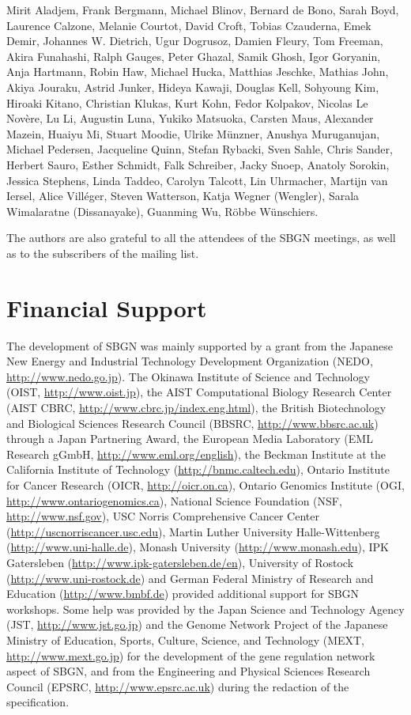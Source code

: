 Mirit Aladjem, Frank Bergmann, Michael Blinov, Bernard de Bono, Sarah Boyd, Laurence Calzone, Melanie Courtot, David Croft, Tobias Czauderna, Emek Demir, Johannes W. Dietrich, Ugur Dogrusoz, Damien Fleury, Tom Freeman, Akira Funahashi, Ralph Gauges, Peter Ghazal, Samik Ghosh, Igor Goryanin, Anja Hartmann, Robin Haw, Michael Hucka, Matthias Jeschke, Mathias John, Akiya Jouraku, Astrid Junker, Hideya Kawaji, Douglas Kell, Sohyoung Kim, Hiroaki Kitano, Christian Klukas, Kurt Kohn, Fedor Kolpakov, Nicolas Le Nov\`{e}re, Lu Li, Augustin Luna, Yukiko Matsuoka, Carsten Maus, Alexander Mazein, Huaiyu Mi, Stuart Moodie, Ulrike M\"unzner, Anushya Muruganujan, Michael Pedersen, Jacqueline Quinn, Stefan Rybacki, Sven Sahle, Chris Sander, Herbert Sauro, Esther Schmidt, Falk Schreiber, Jacky Snoep, Anatoly Sorokin, Jessica Stephens, Linda Taddeo, Carolyn Talcott, Lin Uhrmacher, Martijn van Iersel, Alice Vill\'{e}ger, Steven Watterson, Katja Wegner (Wengler), Sarala Wimalaratne (Dissanayake), Guanming Wu, R\"obbe W\"unschiers.

The authors are also grateful to all the attendees of the SBGN meetings, as 
well as to the subscribers of the  mailing list.


\section{Financial Support}

The development of SBGN was mainly supported by a grant from the Japanese New Energy and Industrial Technology Development Organization (NEDO, \url{http://www.nedo.go.jp}). 
The Okinawa Institute of Science and Technology (OIST, \url{http://www.oist.jp}), 
the AIST Computational Biology Research Center (AIST CBRC, \url{http://www.cbrc.jp/index.eng.html}), 
the British Biotechnology and Biological Sciences Research Council (BBSRC, \url{http://www.bbsrc.ac.uk}) through a Japan Partnering Award, 
the European Media Laboratory (EML Research gGmbH, \url{http://www.eml.org/english}), 
the Beckman Institute at the California Institute of Technology (\url{http://bnmc.caltech.edu}), 
Ontario Institute for Cancer Research (OICR, \url{http://oicr.on.ca}), 
Ontario Genomics Institute (OGI, \url{http://www.ontariogenomics.ca}), 
National Science Foundation (NSF, \url{http://www.nsf.gov}), 
USC Norris Comprehensive Cancer Center (\url{http://uscnorriscancer.usc.edu}), 
Martin Luther University Halle-Wittenberg (\url{http://www.uni-halle.de}), 
Monash University (\url{http://www.monash.edu}), 
IPK Gatersleben (\url{http://www.ipk-gatersleben.de/en}), 
University of Rostock (\url{http://www.uni-rostock.de})  and 
German Federal Ministry of Research and Education (\url{http://www.bmbf.de}) provided additional support for SBGN workshops. 
Some help was provided by the Japan Science and Technology Agency (JST, \url{http://www.jst.go.jp}) and the Genome Network Project of the Japanese Ministry of Education, Sports, Culture, Science, and Technology (MEXT, \url{http://www.mext.go.jp}) for the development of the gene regulation network aspect of SBGN, and from the Engineering and Physical Sciences Research Council (EPSRC, \url{http://www.epsrc.ac.uk}) during the redaction of the specification.


